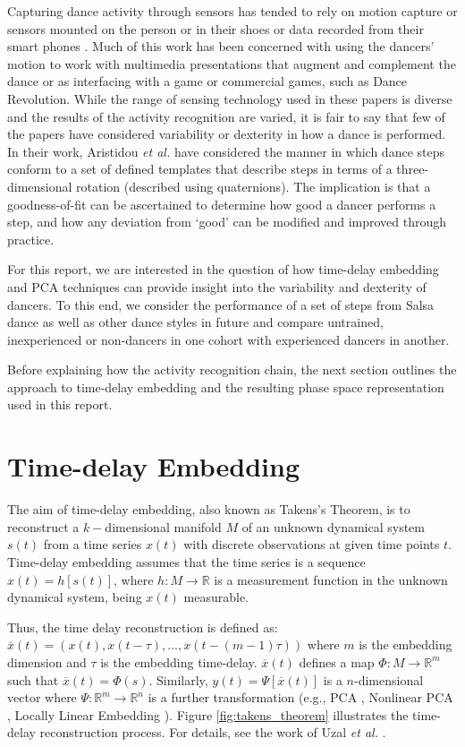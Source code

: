 \documentclass[10pt,journal,compsoc]{IEEEtran}
\begin{document}
Capturing dance activity through sensors has tended 
to rely on motion capture \cite{Alexiadis2014} or sensors mounted on the 
person \cite{Lynch2005} or in their shoes \cite{Paradiso1997} or data recorded from their 
smart phones \cite{Wei2014}. Much of this work has been concerned 
with using the dancers' motion to work with multimedia 
presentations that augment and complement the dance \cite{Griffith1998, Park2006}
or as interfacing with a game \cite{Chu2012} or commercial games, 
such as Dance Revolution. While the range of sensing 
technology used in these papers is diverse and the results 
of the activity recognition are varied, it is fair to say that 
few of the papers have considered variability or dexterity in how a 
dance is performed. In their work, Aristidou \textit{et al.} \cite{Aristidou2014} have 
considered the manner in which dance steps conform to 
a set of defined templates that describe steps in terms of 
a three-dimensional rotation (described using quaternions).  
The implication is that a goodness-of-fit can be ascertained 
to determine how good a dancer performs a step, and how 
any deviation from ‘good’ can be modified and improved 
through practice. 

For this report, we are interested in the question of how 
time-delay embedding and PCA techniques can provide 
insight into the variability and dexterity of dancers. To this 
end, we consider the performance of a set of steps from Salsa 
dance  as well as other dance styles in future and compare 
untrained, inexperienced or non-dancers in one cohort with 
experienced dancers in another.

Before explaining how the activity recognition chain, the next 
section outlines the approach to time-delay embedding and 
the resulting phase space representation used in this report. 


\section{Time-delay Embedding}
The aim of time-delay embedding, also known as Takens's 
Theorem, is to reconstruct a $k-$dimensional manifold $M$ 
of an unknown dynamical system $s(t)$ from a time series 
$x(t)$ with discrete observations at given time points $t$. 
Time-delay embedding assumes that the time series is a sequence 
$x(t)=h[s(t)]$,  where  $h: M \rightarrow \mathbb{R}$ is a measurement function 
in the unknown dynamical system, being $x(t)$ measurable.

Thus, the time delay reconstruction is defined as:
$\overline{x}(t) = (x(t), x(t-\tau),...,x(t-(m-1)\tau))$ 
where $m$ is the embedding dimension and $\tau$ is the embedding time-delay.
$\overline{x}(t)$ defines a map $\varPhi: M \rightarrow \mathbb{R}^m$ such that 
$\overline{x}(t) = \varPhi(s)$.
Similarly, $y(t)= \varPsi [\overline{x}(t)]$ is a $n$-dimensional vector 
where $\varPsi: \mathbb{R}^m \rightarrow \mathbb{R}^n$ is a further transformation 
(e.g., PCA \cite{Shlens2014}, Nonlinear PCA \cite{Kruger2007}, 
Locally Linear Embedding \cite{Roweis2000}). Figure \ref{fig:takens_theorem} 
illustrates the time-delay reconstruction process. For details, 
see the work of Uzal \textit{et al.} \cite{Uzal2011}.
\end{document}

